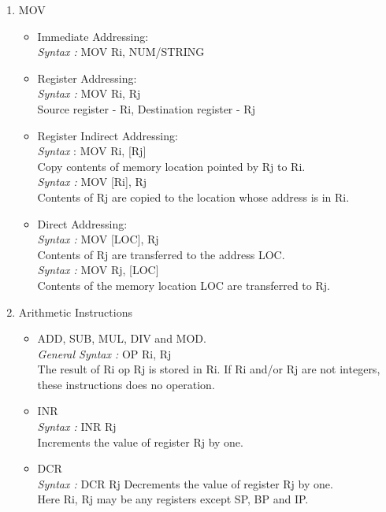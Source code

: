 \documentclass[11pt]{article}
\begin{document}
\begin{enumerate}
\item MOV
\begin{itemize}
\item Immediate Addressing:\\
\textit{Syntax :} MOV Ri, NUM/STRING
\item Register Addressing:\\
\textit{Syntax :} MOV Ri, Rj\\
Source register - Ri, Destination register - Rj
\item Register Indirect Addressing:\\
\textit{Syntax }: MOV Ri, [Rj]\\
Copy contents of memory location pointed by Rj to Ri.\\
\textit{Syntax :} MOV [Ri], Rj \\
Contents of Rj are copied to the location whose address is in Ri.
\item Direct Addressing:\\
\textit{Syntax :} MOV [LOC], Rj\\
Contents of Rj are transferred to the address LOC.\\
\textit{Syntax :} MOV Rj, [LOC]\\
Contents of the memory location LOC are transferred to Rj.
\end{itemize}


\item Arithmetic Instructions

\begin{itemize}
\item ADD, SUB, MUL, DIV and MOD.\\
\textit{General Syntax :} OP Ri, Rj\\
The result of Ri op Rj is stored in Ri. If Ri and/or Rj are not integers, these instructions does no operation.
\item INR\\
\textit{Syntax :} INR Rj\\
Increments the value of register Rj by one.
\item  DCR\\
\textit{Syntax :} DCR Rj
Decrements the value of register Rj by one.\\
Here Ri, Rj may be any registers except SP, BP and IP.
\end{itemize}



\end{enumerate}
\end{document}
